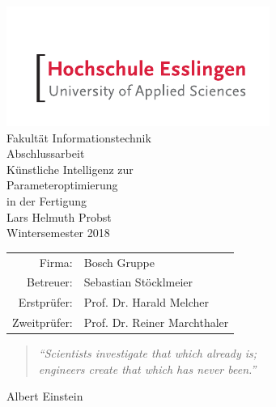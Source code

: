 





\begin{titlepage}
    \begin{center}
        \includegraphics[scale=2.5]{images/he_logo.pdf}\\
        \vspace{1cm} Fakultät Informationstechnik\\
        \vspace{1.5cm} \Large Abschlussarbeit\\
        \vspace{1.5cm} \Huge Künstliche Intelligenz zur \\ Parameteroptimierung \\ in der Fertigung\\
        \vspace{1.5cm} \Large Lars Helmuth Probst\\\normalsize
        \vspace{0.5cm} Wintersemester 2018\\\normalsize
        \vfill{}
        \begin{tabular}{rl}
            Firma: & Bosch Gruppe\\[0.5cm]
            Betreuer: & Sebastian Stöcklmeier\\[0.5cm]
            Erstprüfer: & Prof. Dr. Harald Melcher\\[0.5cm]
            Zweitprüfer: & Prof. Dr. Reiner Marchthaler
        \end{tabular}
    \end{center}
\end{titlepage}

\thispagestyle{empty}
\vspace*{2cm}
\begin{center}
    \begin{minipage}{12cm}
        \begin{center}
        \end{center}
    \end{minipage}

    \vfill{}

    \begin{minipage}{10cm}
        \begin{quote}
            \textit{\enquote{Scientists investigate that which already is;\\ engineers create that which has never been.}}
        \end{quote}
        \hfill Albert Einstein
    \end{minipage}
\end{center}

